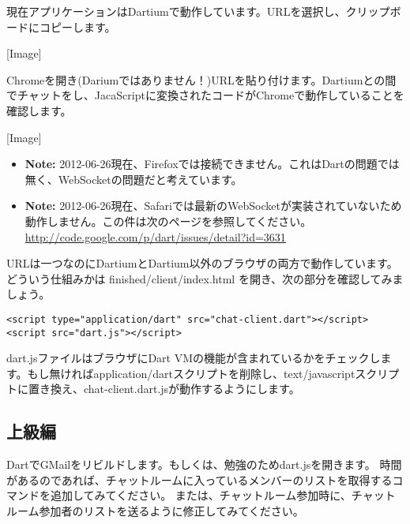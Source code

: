 現在アプリケーションはDartiumで動作しています。URLを選択し、クリップボードにコピーします。

[Image]

Chromeを開き(Dariumではありません！)URLを貼り付けます。Dartiumとの間でチャットをし、JacaScriptに変換されたコードがChromeで動作していることを確認します。

[Image]

\begin{itemize}
\item {\bf Note:} 2012-06-26現在、Firefoxでは接続できません。これはDartの問題では無く、WebSocketの問題だと考えています。
\item {\bf Note:} 2012-06-26現在、Safariでは最新のWebSocketが実装されていないため動作しません。この件は次のページを参照してください。 \url{http://code.google.com/p/dart/issues/detail?id=3631}
\end{itemize}

URLは一つなのにDartiumとDartium以外のブラウザの両方で動作しています。どういう仕組みかは finished/client/index.html を開き、次の部分を確認してみましょう。

\begin{verbatim}
<script type="application/dart" src="chat-client.dart"></script>
<script src="dart.js"></script>
\end{verbatim}

dart.jsファイルはブラウザにDart VMの機能が含まれているかをチェックします。もし無ければapplication/dartスクリプトを削除し、text/javascriptスクリプトに置き換え、chat-client.dart.jsが動作するようにします。

\subsection{上級編}

DartでGMailをリビルドします。もしくは、勉強のためdart.jsを開きます。
時間があるのであれば、チャットルームに入っているメンバーのリストを取得するコマンドを追加してみてください。
または、チャットルーム参加時に、チャットルーム参加者のリストを送るように修正してみてください。


